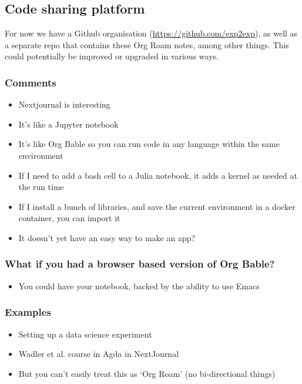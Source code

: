 \documentclass[11pt]{article}
\begin{document}
\subsection{Code sharing platform}
\label{sec:org8675f1a}
For now we have a Github organisation (\url{https://github.com/exp2exp}), as
well as a separate repo that contains these Org Roam notes, among
other things.  This could potentially be improved or upgraded in
various ways.

\subsubsection{Comments}
\label{sec:org3633f35}

\begin{itemize}
\item Nextjournal is interesting
\item It's like a Jupyter notebook
\item It's like Org Bable so you can run code in any language within the same environment
\item If I need to add a bash cell to a Julia notebook, it adds a kernel as needed at the run time
\item If I install a bunch of libraries, and save the current environment in a docker container, you can import it
\item It doesn't yet have an easy way to make an app?
\end{itemize}

\subsubsection{What if you had a browser based version of Org Bable?}
\label{sec:org0c9f535}

\begin{itemize}
\item You could have your notebook, backed by the ability to use Emacs
\end{itemize}

\subsubsection{Examples}
\label{sec:org115f9c9}

\begin{itemize}
\item Setting up a data science experiment
\item Wadler et al. course in Agda in NextJournal
\item But you can't easily treat this as ‘Org Roam’ (no bi-directional things)
\end{itemize}
\end{document}
